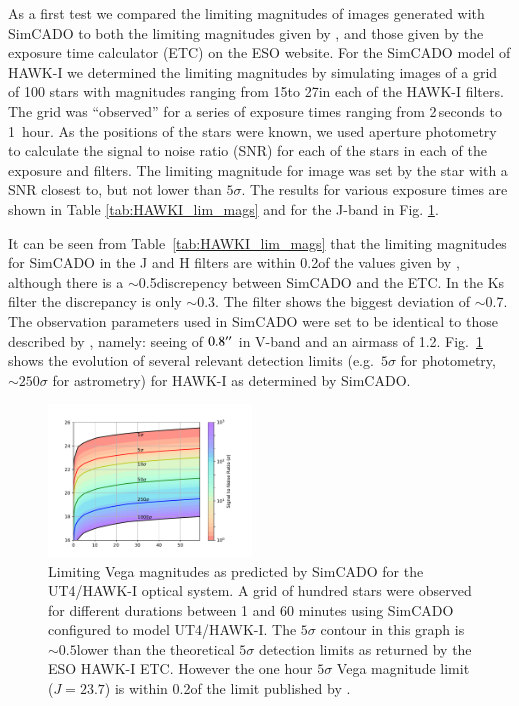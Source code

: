 As a first test we compared the limiting magnitudes of images generated with SimCADO to both the limiting magnitudes given by \citet{hawki}, and those given by the exposure time calculator (ETC) on the ESO website. For the SimCADO model of HAWK-I we determined the limiting magnitudes by simulating images of a grid of 100 stars with magnitudes ranging from 15\m to 27\m in each of the HAWK-I filters. The grid was ``observed'' for a series of exposure times ranging from 2\,seconds to 1~hour. As the positions of the stars were known, we used aperture photometry to calculate the signal to noise ratio (SNR) for each of the stars in each of the exposure and filters. The limiting magnitude for image was set by the star with a SNR closest to, but not lower than $5\sigma$. The results for various exposure times are shown in Table \ref{tab:HAWKI_lim_mags} and for the J-band in Fig. \ref{fig:HAWKI_rainbow_j}.

It can be seen from Table~\ref{tab:HAWKI_lim_mags} that the limiting magnitudes for SimCADO in the J and H filters are within 0.2\m of the values given by \citet{hawki}, although there is a $\sim$0.5\m discrepency between SimCADO and the ETC. In the Ks filter the discrepancy is only $\sim$0.3\m. The \brgamma filter shows the biggest deviation of $\sim$0.7\m. The observation parameters used in SimCADO were set to be identical to those described by \citet{hawki}, namely: seeing of $0.8^{\prime\prime}$ in V-band and an airmass of 1.2. Fig.~\ref{fig:HAWKI_rainbow_j} shows the evolution of several relevant detection limits (e.g.\ $5\sigma$ for photometry, $\sim 250\sigma$ for astrometry) for HAWK-I as determined by SimCADO.


\begin{figure}

    \centering
    \includegraphics[width=0.48\textwidth]{images/HAWKI_rainbow_J}
    
    \caption{Limiting Vega magnitudes as predicted by SimCADO for the UT4/HAWK-I optical system. A grid of hundred stars were observed for different durations between 1 and 60 minutes using SimCADO configured to model UT4/HAWK-I. The $5\sigma$ contour in this graph is $\sim 0.5$\m lower than the theoretical $5\sigma$ detection limits as returned by the ESO HAWK-I ETC. However the one hour $5\sigma$ Vega magnitude limit ($J=23.7$\m) is within 0.2\m  of the limit published by \citet{hawki}.}
    \label{fig:HAWKI_rainbow_j}

\end{figure}


